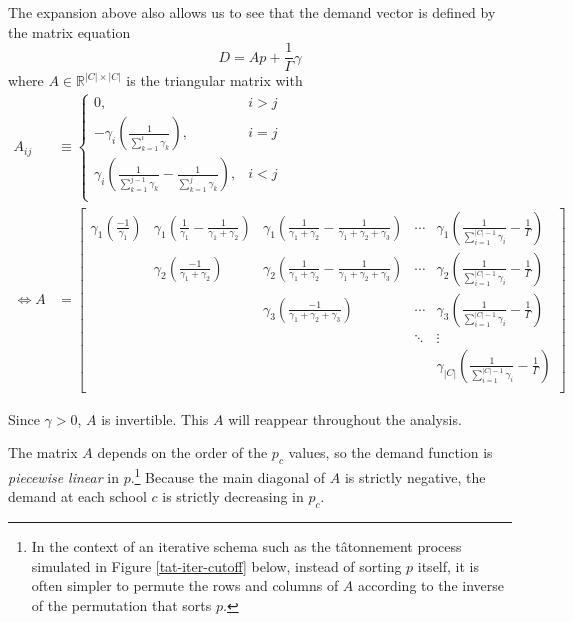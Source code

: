 \documentclass[12pt]{article}
\numberwithin{equation}{subsection}
\theoremstyle{definition}
\begin{document}
The expansion above also allows us to see that the demand vector is defined by the matrix equation
\begin{equation}D = A p + \frac{1}{\Gamma}\gamma \label{demandmatrixeq}\end{equation}
where $A\in \mathbb{R}^{|C| \times |C|}$ is the triangular matrix with
\begin{align} \label{Adef}
A_{ij} &\equiv \begin{cases}
0, & i > j \\
-\gamma_i \left(\frac{1}{ \sum_{k=1}^i \gamma_k}\right), & i=j \\
\gamma_i \left( \frac{1}{\sum_{k=1}^{j-1} \gamma_k} -  \frac{1}{\sum_{k=1}^{j} \gamma_k}\right), & i<j \\
\end{cases} \\[.8em]
\iff A &= \begin{bmatrix}
\gamma_1 \left( \frac{-1}{\gamma_1} \right) & \gamma_1 \left(\frac{1}{\gamma_1} - \frac{1}{\gamma_1 + \gamma_2} \right) & \gamma_1 \left(\frac{1}{\gamma_1 + \gamma_2} - \frac{1}{\gamma_1 + \gamma_2 + \gamma_3} \right) & \cdots &  \gamma_1 \left(\frac{1}{\sum_{i=1}^{|C| - 1}\gamma_i} - \frac{1}{\Gamma}  \right)  \\
 & \gamma_2 \left( \frac{-1}{\gamma_1 + \gamma_2} \right) & \gamma_2 \left(\frac{1}{\gamma_1 + \gamma_2} - \frac{1}{\gamma_1 + \gamma_2 + \gamma_3} \right) & \cdots &  \gamma_2 \left(\frac{1}{\sum_{i=1}^{|C| - 1}\gamma_i} - \frac{1}{\Gamma} \right)  \\
 &  & \gamma_3 \left( \frac{-1}{\gamma_1 + \gamma_2 + \gamma_3} \right) & \cdots &  \gamma_3 \left(\frac{1}{\sum_{i=1}^{|C| - 1}\gamma_i} - \frac{1}{\Gamma} \right)  \\
 & & & \ddots & \vdots \\
 &  &  &  &  \gamma_{|C|} \left(\frac{1}{\sum_{i=1}^{|C| - 1}\gamma_i} -\frac{1}{\Gamma}  \right)  \\
\end{bmatrix}\end{align}

Since $\gamma > 0$, $A$ is invertible. This $A$ will reappear throughout the analysis. 

The matrix $A$ depends on the order of the $p_c$ values, so the demand function is \emph{piecewise linear} in $p$.\footnote{In the context of an iterative schema such as the t\^{a}tonnement process simulated in Figure \ref{tat-iter-cutoff} below, instead of sorting $p$ itself, it is often simpler to permute the rows and columns of $A$ according to the inverse of the permutation that sorts $p$.} Because the main diagonal of $A$ is strictly negative, the demand at each school $c$ is strictly decreasing in $p_c$. 
\end{document}
